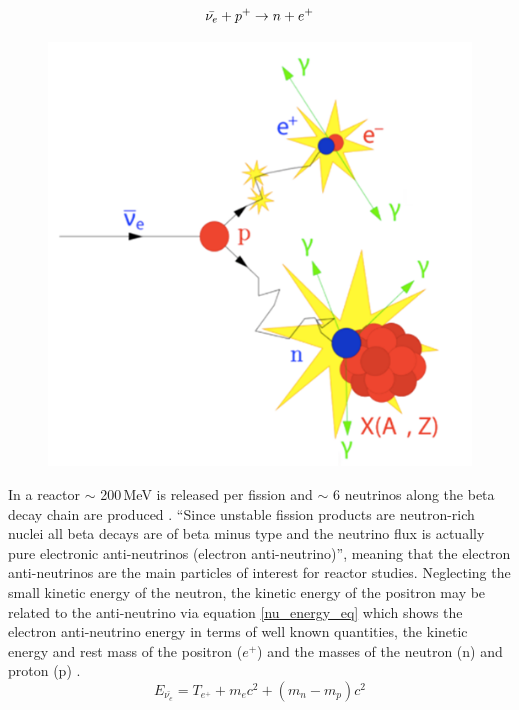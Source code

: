 \begin{equation}
    \Bar{\nu_e} + p^+ \rightarrow n + e^+
    \label{inverse_beta_decay}
\end{equation}

\begin{figure}[!h]
  \centering
  \includegraphics[width=0.5\linewidth]{Chapter2/Figs/Raster/inverse_beta_diagram.png} 
  \label{fig:inverse_beta_diagram}
\end{figure}

In a reactor $\sim$ 200\,MeV is released per fission and $\sim$ 6 neutrinos along the beta decay chain are produced \cite{Mueller_2011}. ``Since unstable fission products are neutron-rich nuclei all beta decays are of beta minus type and the neutrino flux is actually pure electronic anti-neutrinos (electron anti-neutrino)''\cite{Mueller_2011}, meaning that the electron anti-neutrinos are the main particles of interest for reactor studies. Neglecting the small kinetic energy of the neutron, the kinetic energy of the positron may be related to the anti-neutrino via equation \ref{nu_energy_eq} which shows the electron anti-neutrino energy in terms of well known quantities, the kinetic energy and rest mass of the positron ($e^+$) and the masses of the neutron (n) and proton (p) \cite{Vogel_1999}. 
\begin{equation}
 E_{\bar{\nu_e}} = T_{e^+} + m_{e}c^2 + (m_n - m_p)c^2  %
\label{nu_energy_eq}
\end{equation}

